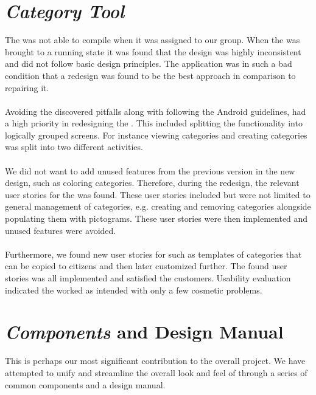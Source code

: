 \section*{\emph{Category Tool}}
The \ct was not able to compile when it was assigned to our group. When the \ct was brought to a running state it was found that the design was highly inconsistent and did not follow basic design principles. The application was in such a bad condition that a redesign was found to be the best approach in comparison to repairing it.
\\\\
Avoiding the discovered pitfalls along with following the Android guidelines, had a high priority in redesigning the \ct. This included splitting the functionality into logically grouped screens. For instance viewing categories and creating categories was split into two different activities.
\\\\
We did not want to add unused features from the previous version in the new design, such as coloring categories. Therefore, during the redesign, the relevant user stories for the \ct was found. These user stories included but were not limited to general management of categories, e.g. creating and removing categories alongside populating them with pictograms. These user stories were then implemented and unused features were avoided. 
\\\\
Furthermore, we found new user stories for \ct such as templates of categories that can be copied to citizens and then later customized further. The found user stories was all implemented and satisfied the customers. Usability evaluation indicated the \ct worked as intended with only a few cosmetic problems.

\section*{\giraf \emph{Components} and Design Manual}

This is perhaps our most significant contribution to the overall project. We have attempted to unify and streamline the overall look and feel of \giraf through a series of common components and a design manual.




